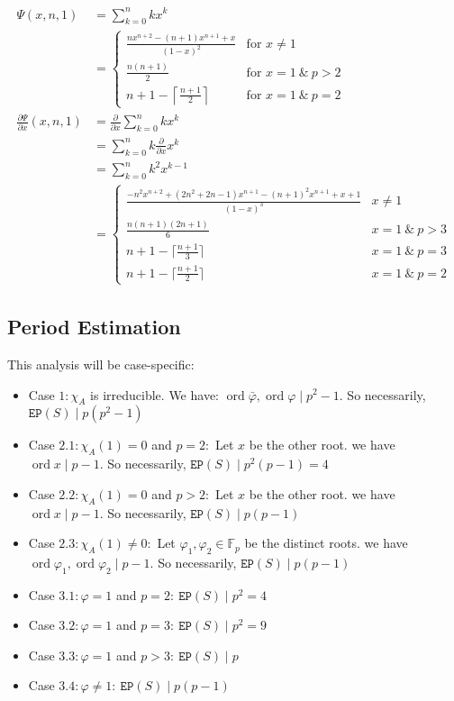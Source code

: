 \documentclass[]{article}
\DeclareMathOperator{\ord}{ord}
\begin{document}
\begin{align*}
	\Psi(x,n,1)&= \sum_{k=0}^n k x^k \\
	&= \begin{cases}
		\frac{nx^{n+2}-(n+1)x^{n+1}+x}{(1-x)^2}&  \text{for } x\neq 1 \\
		\frac{n(n+1)}{2} & \text{for } x=1 \ \& \ p>2 \\
		n+1-\left\lceil \frac{n+1}{2}\right\rceil & \text{for } x=1 \ \& \ p=2
			\end{cases} \\
	\frac{\partial\Psi}{\partial x}(x,n,1)&=\frac{\partial }{\partial x} \sum_{k=0}^n k x^k\\
	&=\sum_{k=0}^n k \frac{\partial }{\partial x} x^k \\
	&= \sum_{k=0}^n k^2x^{k-1}\\
	&=\begin{cases}
		\frac{-n^2x^{n+2}+(2n^2+2n-1)x^{n+1}-(n+1)^2x^{n+1}+x+1}{(1-x)^3} &x\neq 1\\
		\frac{n(n+1)(2n+1)}{6} & x=1 \ \& \ p>3\\
		n+1-\lceil \frac{n+1}{3} \rceil & x=1 \ \& \ p=3 \\
		n+1-\lceil \frac{n+1}{2} \rceil & x=1 \ \& \ p=2
	\end{cases}
\end{align*}
\pagebreak
\subsection{Period Estimation}
This analysis will be case-specific:
\begin{itemize}
	\item Case $1: \chi_A$ is irreducible. We have: $\ord \bar\varphi,\ord \varphi \mid p^2-1.$
	\newline
	So necessarily, $\mathtt{EP}(S) \mid p(p^2-1) $
	\item Case $2.1: \chi_A(1)=0$ and $p=2:$ Let $x$ be the other root.
	\newline we have $\ord x \mid p-1.$ So necessarily, $\mathtt{EP}(S) \mid p^2(p-1) = 4 $
	\item Case $2.2: \chi_A(1)=0$ and $p>2: $
	 Let $x$ be the other root. 
	 \newline 
	 we have $\ord x \mid p-1.$ So necessarily, $\mathtt{EP}(S) \mid p(p-1)$
	\item Case $2.3: \chi_A(1)\neq 0: $
	Let $\varphi_1,\varphi_2\in\mathbb{F}_p$ be the distinct roots.
	\newline
	we have $\ord \varphi_1,\ord \varphi_2 \mid p-1.$ So necessarily, $\mathtt{EP}(S) \mid p(p-1)$
	\item Case $3.1: \varphi = 1$ and $p=2: \ \mathtt{EP}(S) \mid p^2=4$
	\item Case $3.2: \varphi = 1$ and $p=3: \ \mathtt{EP}(S) \mid p^2=9$
	\item Case $3.3: \varphi = 1$ and $p>3: \ \mathtt{EP}(S) \mid p$
	\item Case $3.4: \varphi \neq 1: \ \mathtt{EP}(S) \mid p(p-1)$
\end{itemize}
\end{document}
